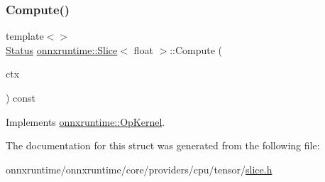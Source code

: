 \subsubsection{\texorpdfstring{Compute()}{Compute()}\hspace{0.1cm}{\footnotesize\ttfamily [2/2]}}
{\footnotesize\ttfamily template$<$$>$ \\
\mbox{\hyperlink{classonnxruntime_1_1common_1_1Status}{Status}} \mbox{\hyperlink{structonnxruntime_1_1Slice}{onnxruntime\+::\+Slice}}$<$ float $>$\+::Compute (\begin{DoxyParamCaption}\item[{\mbox{\hyperlink{classonnxruntime_1_1OpKernelContext}{Op\+Kernel\+Context}} $\ast$}]{ctx }\end{DoxyParamCaption}) const\hspace{0.3cm}{\ttfamily [virtual]}}



Implements \mbox{\hyperlink{classonnxruntime_1_1OpKernel_a9eca8656a78b1b3ab9d3351a12798650}{onnxruntime\+::\+Op\+Kernel}}.



The documentation for this struct was generated from the following file\+:\begin{DoxyCompactItemize}
\item 
onnxruntime/onnxruntime/core/providers/cpu/tensor/\mbox{\hyperlink{cpu_2tensor_2slice_8h}{slice.\+h}}\end{DoxyCompactItemize}
